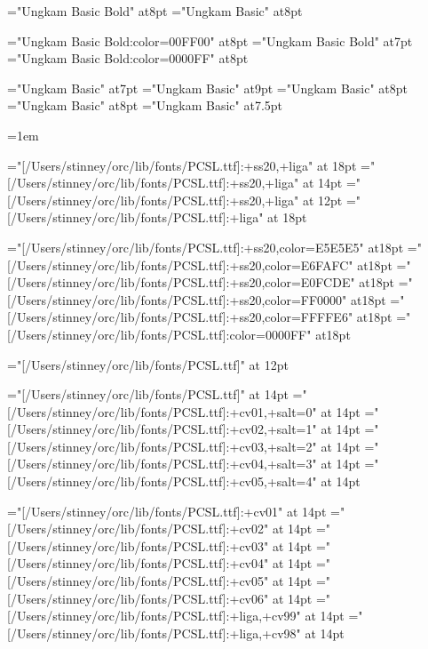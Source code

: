 

\font\slnmfont="Ungkam Basic Bold" at8pt
\font\sltgfont="Ungkam Basic" at8pt


\font\slnmfontw="Ungkam Basic Bold:color=00FF00" at8pt
\font\slnmfontx="Ungkam Basic Bold" at7pt
\font\slnmfonty="Ungkam Basic Bold:color=0000FF" at8pt

\font\akafont="Ungkam Basic" at7pt
\font\sldistfont="Ungkam Basic" at9pt
\font\oidfont="Ungkam Basic" at8pt
\font\oidfontx="Ungkam Basic" at8pt
\font\zatufont="Ungkam Basic" at7.5pt

\oidfont{}=1em \showthe{}

\font\pcssXX="[/Users/stinney/orc/lib/fonts/PCSL.ttf]:+ss20,+liga" at 18pt
\font\pcssxx="[/Users/stinney/orc/lib/fonts/PCSL.ttf]:+ss20,+liga" at 14pt
\font\pcssxxx="[/Users/stinney/orc/lib/fonts/PCSL.ttf]:+ss20,+liga" at 12pt
\font\pcxviii="[/Users/stinney/orc/lib/fonts/PCSL.ttf]:+liga" at 18pt

\font\pceee="[/Users/stinney/orc/lib/fonts/PCSL.ttf]:+ss20,color=E5E5E5" at18pt
\font\pceff="[/Users/stinney/orc/lib/fonts/PCSL.ttf]:+ss20,color=E6FAFC" at18pt
\font\pcefd="[/Users/stinney/orc/lib/fonts/PCSL.ttf]:+ss20,color=E0FCDE" at18pt
\font\pcfee="[/Users/stinney/orc/lib/fonts/PCSL.ttf]:+ss20,color=FF0000" at18pt
\font\pcffe="[/Users/stinney/orc/lib/fonts/PCSL.ttf]:+ss20,color=FFFFE6" at18pt
\font\pcblu="[/Users/stinney/orc/lib/fonts/PCSL.ttf]:color=0000FF" at18pt

\font\pcringop="[/Users/stinney/orc/lib/fonts/PCSL.ttf]" at 12pt

\font\pcseq="[/Users/stinney/orc/lib/fonts/PCSL.ttf]" at 14pt
\font\pcseqi="[/Users/stinney/orc/lib/fonts/PCSL.ttf]:+cv01,+salt=0" at 14pt
\font\pcseqii="[/Users/stinney/orc/lib/fonts/PCSL.ttf]:+cv02,+salt=1" at 14pt
\font\pcseqiii="[/Users/stinney/orc/lib/fonts/PCSL.ttf]:+cv03,+salt=2" at 14pt
\font\pcseqiv="[/Users/stinney/orc/lib/fonts/PCSL.ttf]:+cv04,+salt=3" at 14pt
\font\pcseqv="[/Users/stinney/orc/lib/fonts/PCSL.ttf]:+cv05,+salt=4" at 14pt

\font\pccvi="[/Users/stinney/orc/lib/fonts/PCSL.ttf]:+cv01" at 14pt
\font\pccvii="[/Users/stinney/orc/lib/fonts/PCSL.ttf]:+cv02" at 14pt
\font\pccviii="[/Users/stinney/orc/lib/fonts/PCSL.ttf]:+cv03" at 14pt
\font\pccviv="[/Users/stinney/orc/lib/fonts/PCSL.ttf]:+cv04" at 14pt
\font\pccvv="[/Users/stinney/orc/lib/fonts/PCSL.ttf]:+cv05" at 14pt
\font\pccvvi="[/Users/stinney/orc/lib/fonts/PCSL.ttf]:+cv06" at 14pt
\font\pccvxcix="[/Users/stinney/orc/lib/fonts/PCSL.ttf]:+liga,+cv99" at 14pt
\font\pccvxcviii="[/Users/stinney/orc/lib/fonts/PCSL.ttf]:+liga,+cv98" at 14pt

